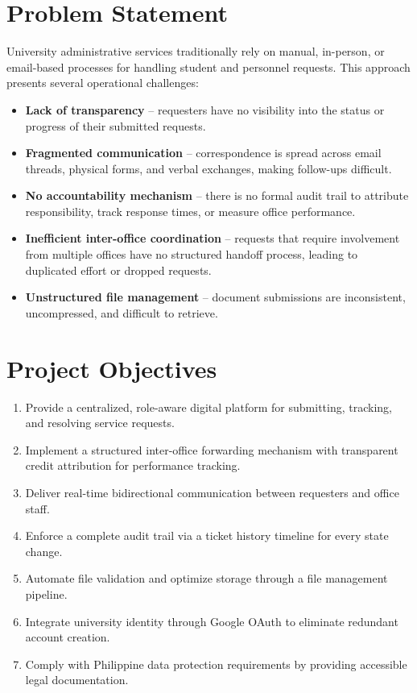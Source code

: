 \documentclass[12pt,a4paper]{article}
\begin{document}
\section{Problem Statement}

University administrative services traditionally rely on manual, in-person, or email-based processes for handling student and personnel requests. This approach presents several operational challenges:

\begin{itemize}
    \item \textbf{Lack of transparency} -- requesters have no visibility into the status or progress of their submitted requests.
    \item \textbf{Fragmented communication} -- correspondence is spread across email threads, physical forms, and verbal exchanges, making follow-ups difficult.
    \item \textbf{No accountability mechanism} -- there is no formal audit trail to attribute responsibility, track response times, or measure office performance.
    \item \textbf{Inefficient inter-office coordination} -- requests that require involvement from multiple offices have no structured handoff process, leading to duplicated effort or dropped requests.
    \item \textbf{Unstructured file management} -- document submissions are inconsistent, uncompressed, and difficult to retrieve.
\end{itemize}

\section{Project Objectives}

\begin{enumerate}
    \item Provide a centralized, role-aware digital platform for submitting, tracking, and resolving service requests.
    \item Implement a structured inter-office forwarding mechanism with transparent credit attribution for performance tracking.
    \item Deliver real-time bidirectional communication between requesters and office staff.
    \item Enforce a complete audit trail via a ticket history timeline for every state change.
    \item Automate file validation and optimize storage through a file management pipeline.
    \item Integrate university identity through Google OAuth to eliminate redundant account creation.
    \item Comply with Philippine data protection requirements by providing accessible legal documentation.
\end{enumerate}
\end{document}

